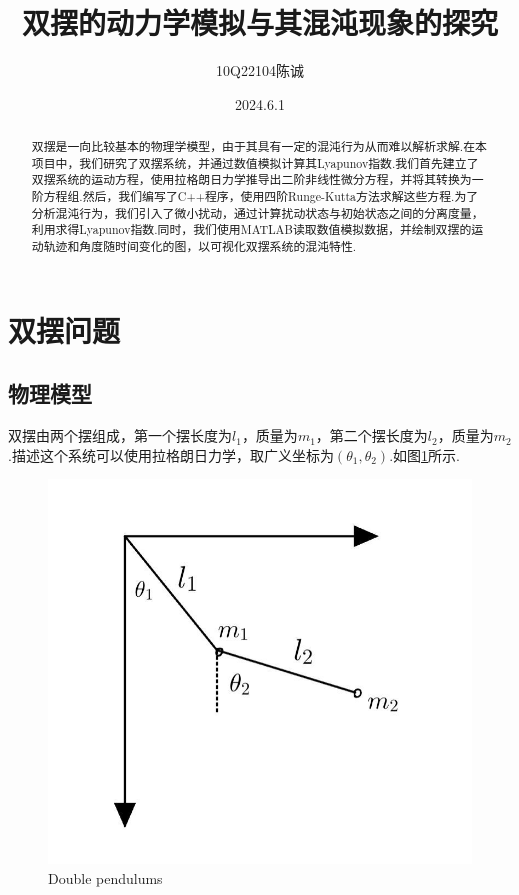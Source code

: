 \documentclass[12pt, a4paper, oneside]{article}
\title{双摆的动力学模拟与其混沌现象的探究}
\author{10Q22104陈诚}
\date{2024.6.1}
\begin{document}
\maketitle

\begin{abstract}
双摆是一向比较基本的物理学模型，由于其具有一定的混沌行为从而难以解析求解.在本项目中，我们研究了双摆系统，并通过数值模拟计算其Lyapunov指数.我们首先建立了双摆系统的运动方程，使用拉格朗日力学推导出二阶非线性微分方程，并将其转换为一阶方程组.然后，我们编写了C++程序，使用四阶Runge-Kutta方法求解这些方程.为了分析混沌行为，我们引入了微小扰动，通过计算扰动状态与初始状态之间的分离度量，利用求得Lyapunov指数.同时，我们使用MATLAB读取数值模拟数据，并绘制双摆的运动轨迹和角度随时间变化的图，以可视化双摆系统的混沌特性.
\end{abstract}

\section{双摆问题}

\subsection{物理模型}
双摆由两个摆组成，第一个摆长度为$l_1$，质量为$m_1$，第二个摆长度为$l_2$，质量为$m_2$.描述这个系统可以使用拉格朗日力学，取广义坐标为$\left(\theta_1 , \theta_2 \right)$.如图\ref{fig:double_pendulums}所示.
\begin{figure}[htbp]
	\centering
	\includegraphics[width = 10 cm]{figures/double_pendulum.jpg}
	\caption{Double pendulums}
	\label{fig:double_pendulums}
\end{figure}
\end{document}
